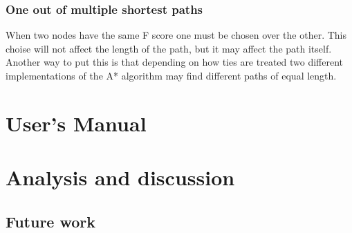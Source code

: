 \documentclass[12pt, a4paper]{article}
\begin{document}



\subsubsection{One out of multiple shortest paths}

When two nodes have the same F score one must be chosen over the other. This
choise will not affect the length of the path, but it may affect the path
itself. Another way to put this is that depending on how ties are treated two
different implementations of the A* algorithm may find different paths of equal
length. \cite{astar2}


\section{User's Manual}





\section{Analysis and discussion}
\label{Analysis}





\subsection{Future work}








\pagebreak


\end{document}
